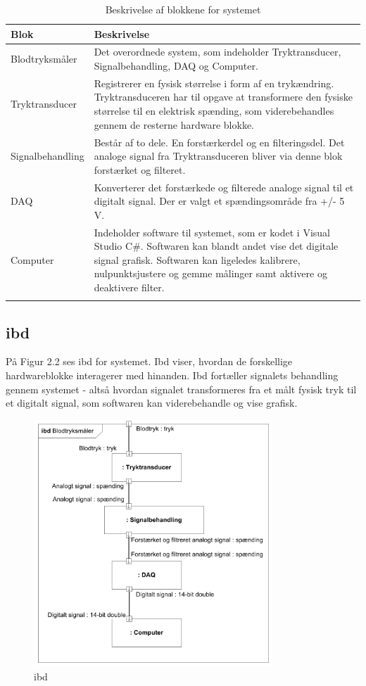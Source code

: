 \begin{longtabu} to 
	\textbf{Blok} &	\textbf{Beskrivelse} \\[-1ex]
	\midrule
	Blodtryksmåler & Det overordnede system, som indeholder Tryktransducer, Signalbehandling, DAQ og Computer.\\[-1ex]
	Tryktransducer & Registrerer en fysisk størrelse i form af en trykændring. Tryktransduceren har til opgave at transformere den fysiske størrelse til en elektrisk spænding, som viderebehandles gennem de resterne hardware blokke.  \\[-1ex]
	Signalbehandling & Består af to dele. En forstærkerdel og en filteringsdel. Det analoge signal fra Tryktransduceren bliver via denne blok forstærket og filteret.\\[-1ex]
	DAQ & Konverterer det forstærkede og filterede analoge signal til et digitalt signal. Der er valgt et spændingsområde fra +/- 5 V.\\[-1ex]
	Computer & Indeholder software til systemet, som er kodet i Visual Studio C\#. Softwaren kan blandt andet vise det digitale signal grafisk. Softwaren kan ligeledes kalibrere, nulpunktsjustere og gemme målinger samt aktivere og deaktivere filter.\\[-1ex]
	\caption{Beskrivelse af blokkene for systemet}
	\end{longtabu}
	
\subsection{ibd}
På Figur 2.2 ses ibd for systemet. Ibd viser, hvordan de forskellige hardwareblokke interagerer med hinanden. Ibd fortæller signalets behandling gennem systemet - altså hvordan signalet transformeres fra et målt fysisk tryk til et digitalt signal, som softwaren kan viderebehandle og vise grafisk. 

\begin{figure}[H]
	\centering
	\includegraphics[width=0.8\textwidth]{Figurer/Snip20151209_72}
	\caption{ibd}
	\label{fig:ibd}
\end{figure}

